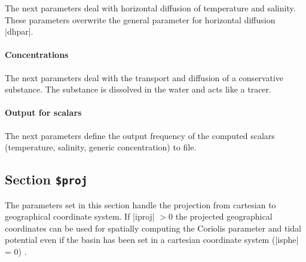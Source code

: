 The next parameters deal with horizontal diffusion of temperature
and salinity. These parameters overwrite the general parameter for
horizontal diffusion |dhpar|.

\par
{}
\par


\paragraph{Concentrations}

The next parameters deal with the transport and diffusion
of a conservative substance. The substance is dissolved in
the water and acts like a tracer.

\par
{}
\par
{}
\par

\par


\paragraph{Output for scalars}

The next parameters define the output frequency of the
computed scalars (temperature, salinity, generic concentration) to file.

\par

\subsection{Section {\tt \$proj}}
The parameters set in this section handle the projection from cartesian to
geographical coordinate system. If |iproj| $>$0 the projected geographical
coordinates can be used for spatially computing the Coriolis parameter
and tidal potential even if the basin has been set in a cartesian coordinate system
(|isphe| = 0) .

